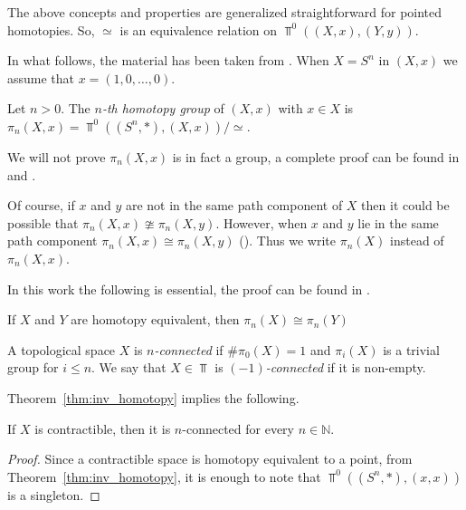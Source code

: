 \documentclass{standalone}
\begin{document}
	The above concepts and properties are generalized straightforward for pointed homotopies. So, $\simeq$ is an equivalence relation on $\Top^{0}((X,x),(Y,y))$.
	
	In what follows, the material has been taken from \cite[Chapter 11]{rotman:1988:algebraic:topology}.  When $X=S^{n}$ in $(X,x)$ we assume that $x=(1,0,\ldots,0)$.
	
	
	\begin{definition}\label{def:homotopy_groups}
		Let $n>0$. The \emph{$n$-th homotopy group} of $(X,x)$ with $x\in X$ is $\pi_{n}(X,x)=\Top^{0}((S^{n},\ast),(X,x))/\simeq$.
	\end{definition}
	
	\begin{remark}\label{rem:groups}
		We will not prove $\pi_{n}(X,x)$ is in fact a group, a complete proof can be found in \cite[Section 6.1]{dieck:2008:algebraic:topology} and \cite[Theorem 11.4 and Corollary 11.17]{rotman:1988:algebraic:topology}.
	\end{remark}
	
	Of course, if $x$ and $y$ are not in the same path component of $X$ then it could be possible that $\pi_{n}(X,x)\ncong\pi_{n}(X,y)$. However, when $x$ and $y$ lie in the same path component $\pi_{n}(X,x)\cong\pi_{n}(X,y)$ (\cite[Theorem 11.24]{rotman:1988:algebraic:topology}). Thus we write $\pi_{n}(X)$ instead of $\pi_{n}(X,x)$.
	
	In this work the following is essential, the proof can be found in \cite[Corollary 11.26]{rotman:1988:algebraic:topology}.
	\begin{theorem}\label{thm:inv_homotopy}
		If $X$ and $Y$ are homotopy equivalent, then $\pi_{n}(X)\cong\pi_{n}(Y)$
	\end{theorem}
	
	
	\begin{definition}\label{defn:1_connected}
		A topological space $X$ is \emph{$n$-connected} if $\#\pi_{0}(X)=1$ and $\pi_{i}(X)$ is a trivial group for $i\leq n$. We say that $X\in\Top$ is \emph{$(-1)$-connected} if it is non-empty.
	\end{definition}
	
	Theorem~\ref{thm:inv_homotopy} implies the following.
	
	\begin{lemma}\label{lem:contract}
		If $X$ is contractible, then it is $n$-connected for every $n\in \mathbb{N}$.
	\end{lemma}
	
	
	\begin{proof}
		Since a contractible space is homotopy equivalent to a point, from Theorem~\ref{thm:inv_homotopy}, it is enough to note that $\Top^{0}((S^{n},\ast),(x,x))$ is a singleton.
	\end{proof}
	
\end{document}
